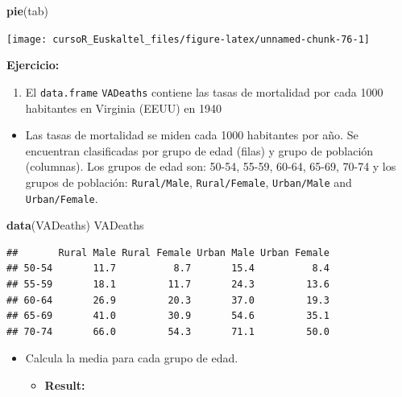 \documentclass[]{book}
\newenvironment{Shaded}{\begin{snugshade}}{\end{snugshade}}
\newcommand{\KeywordTok}[1]{\textcolor[rgb]{0.13,0.29,0.53}{\textbf{#1}}}
\newcommand{\NormalTok}[1]{#1}
\providecommand{\tightlist}{%
  \setlength{\itemsep}{0pt}\setlength{\parskip}{0pt}}
\begin{document}
\begin{Shaded}
\begin{Highlighting}[]
\KeywordTok{pie}\NormalTok{(tab)}
\end{Highlighting}
\end{Shaded}

\begin{center}\texttt{[image: cursoR\_Euskaltel\_files/figure-latex/unnamed-chunk-76-1]} \end{center}

\textbf{Ejercicio:}

\begin{enumerate}
\def\labelenumi{\arabic{enumi}.}
\tightlist
\item
  El \texttt{data.frame} \texttt{VADeaths} contiene las tasas de
  mortalidad por cada 1000 habitantes en Virginia (EEUU) en 1940
\end{enumerate}

\begin{itemize}
\tightlist
\item
  Las tasas de mortalidad se miden cada 1000 habitantes por año. Se
  encuentran clasificadas por grupo de edad (filas) y grupo de población
  (columnas). Los grupos de edad son: 50-54, 55-59, 60-64, 65-69, 70-74
  y los grupos de población: \texttt{Rural/Male}, \texttt{Rural/Female},
  \texttt{Urban/Male} and \texttt{Urban/Female}.
\end{itemize}

\begin{Shaded}
\begin{Highlighting}[]
\KeywordTok{data}\NormalTok{(VADeaths)}
\NormalTok{VADeaths}
\end{Highlighting}
\end{Shaded}

\begin{verbatim}
##       Rural Male Rural Female Urban Male Urban Female
## 50-54       11.7          8.7       15.4          8.4
## 55-59       18.1         11.7       24.3         13.6
## 60-64       26.9         20.3       37.0         19.3
## 65-69       41.0         30.9       54.6         35.1
## 70-74       66.0         54.3       71.1         50.0
\end{verbatim}

\begin{itemize}
\item
  Calcula la media para cada grupo de edad.

  \begin{itemize}
  \tightlist
  \item
    \textbf{Result:}
  \end{itemize}
\end{itemize}
\end{document}
